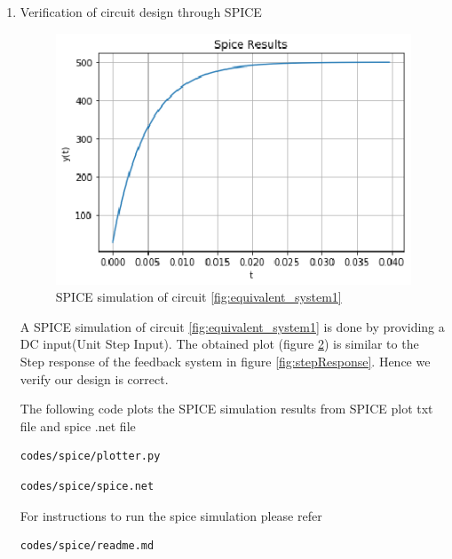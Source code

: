 \begin{enumerate}[label=\thesection.\arabic*.,ref=\thesection.\theenumi]
\begin{figure}[!hbt]
	\begin{center}
			\resizebox{\columnwidth}{!}{}
	\end{center}
\caption{Closed Loop Circuit}
\label{closedloop}
\end{figure}

Figure \ref{closedloop} is the final closed loop design for transfer function $T(s)$

\begin{table}[!ht]
\centering

\caption{Circuit Parameters}
\label{table:DesignParams}
\end{table}

The table \ref{table:DesignParams} provides the parameters for our circuit design


\item Verification of circuit design through SPICE

\begin{figure}[!ht]
\centering
    \includegraphics[width=\columnwidth]{./figs/Figure_4.eps}
  \caption{SPICE simulation of circuit \ref{fig:equivalent_system1}}
  \label{fig:SPICEresult}
\end{figure}

A SPICE simulation of circuit \ref{fig:equivalent_system1} is done by providing a DC input(Unit Step Input). The obtained plot (figure \ref{fig:SPICEresult}) is similar to the Step response of the feedback system in figure \ref{fig:stepResponse}. Hence we verify our design is correct.



The following code plots the SPICE simulation results
from SPICE plot txt file and spice .net file

\begin{lstlisting}
codes/spice/plotter.py
\end{lstlisting}

\begin{lstlisting}
codes/spice/spice.net
\end{lstlisting}

For instructions to run the spice simulation please refer

\begin{lstlisting}
codes/spice/readme.md
\end{lstlisting}
\end{enumerate}